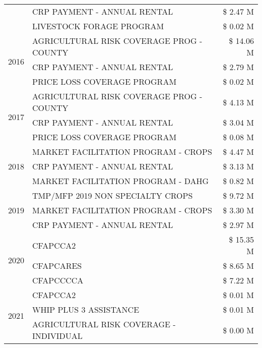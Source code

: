 \begin{tabular}{llr}
 & CRP PAYMENT - ANNUAL RENTAL & \$ 2.47 M \\
 & LIVESTOCK FORAGE PROGRAM & \$ 0.02 M \\
\cline{1-3}
\multirow[t]{3}{*}{2016} & AGRICULTURAL RISK COVERAGE PROG - COUNTY & \$ 14.06 M \\
 & CRP PAYMENT - ANNUAL RENTAL & \$ 2.79 M \\
 & PRICE LOSS COVERAGE PROGRAM & \$ 0.02 M \\
\cline{1-3}
\multirow[t]{3}{*}{2017} & AGRICULTURAL RISK COVERAGE PROG - COUNTY & \$ 4.13 M \\
 & CRP PAYMENT - ANNUAL RENTAL & \$ 3.04 M \\
 & PRICE LOSS COVERAGE PROGRAM & \$ 0.08 M \\
\cline{1-3}
\multirow[t]{3}{*}{2018} & MARKET FACILITATION PROGRAM - CROPS & \$ 4.47 M \\
 & CRP PAYMENT - ANNUAL RENTAL & \$ 3.13 M \\
 & MARKET FACILITATION PROGRAM - DAHG & \$ 0.82 M \\
\cline{1-3}
\multirow[t]{3}{*}{2019} & TMP/MFP 2019 NON SPECIALTY CROPS & \$ 9.72 M \\
 & MARKET FACILITATION PROGRAM - CROPS & \$ 3.30 M \\
 & CRP PAYMENT - ANNUAL RENTAL & \$ 2.97 M \\
\cline{1-3}
\multirow[t]{3}{*}{2020} & CFAPCCA2 & \$ 15.35 M \\
 & CFAPCARES & \$ 8.65 M \\
 & CFAPCCCCA & \$ 7.22 M \\
\cline{1-3}
\multirow[t]{3}{*}{2021} & CFAPCCA2 & \$ 0.01 M \\
 & WHIP PLUS 3 ASSISTANCE & \$ 0.01 M \\
 & AGRICULTURAL RISK COVERAGE - INDIVIDUAL & \$ 0.00 M \\
\cline{1-3}
\bottomrule
\end{tabular}
